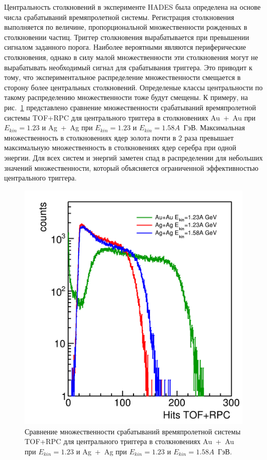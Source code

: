 Центральность столкновений в эксперименте HADES была определена на основе числа срабатываний времяпролетной системы.
Регистрация столкновения выполняется по величине, пропорциональной множественности рожденных в столкновении частиц.
Триггер столкновения вырабатывается при превышении сигналом заданного порога.
Наиболее вероятными являются периферические столкновения, однако в силу малой множественности эти столкновения могут не вырабатывать необходимый сигнал для срабатывания триггера.
Это приводит к тому, что экспериментальное распределение множественности смещается в сторону более центральных столкновений.
Определеные классы центральности по такому распределению множественности тоже будут смещены.
К примеру, на рис.~\ref{fig:hades_multiplicity_comparison} представлено сравнение множественности срабатываний времяпролетной системы TOF+RPC для центрального триггера в столкновениях Au~+~Au при $E_{kin}=1.23$ и Ag~+~Ag при $E_{kin}=1.23$ и $E_{kin}=1.58A$~ГэВ.
Максимальная множественность в столкновениях ядер золота почти в 2 раза превышает максимальную множественность в столкновениях ядер серебра при одной энергии.
Для всех систем и энергий заметен спад в распределении для небольших значений множественности, который объясняется ограниченной эффективностью центрального триггера.
\begin{figure}[ht]
    \begin{center}
        \includegraphics[width=0.55\linewidth]{images/hades_multiplicity_comparison.png}
        \caption{Сравнение множественности срабатываний времяпролетной системы TOF+RPC для центрального триггера в столкновениях Au~+~Au при $E_{kin}=1.23$ и Ag~+~Ag при $E_{kin}=1.23$ и $E_{kin}=1.58A$~ГэВ.}
        \label{fig:hades_multiplicity_comparison}
    \end{center}
\end{figure}
        
